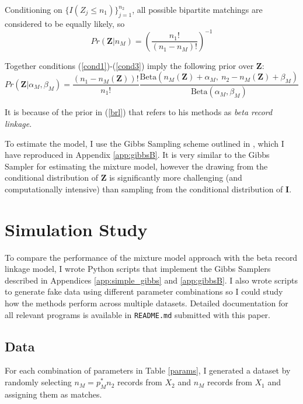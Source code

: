 \documentclass[11pt,reqno]{amsart}
\begin{document}
Conditioning on $\{I(Z_j \leq n_1)\}_{j=1}^{n_2}$, all possible bipartite matchings are considered to be equally likely, so \begin{equation} Pr\left(\mathbf{Z} | n_{M}\right) = \left(\frac{n_1!}{(n_1-n_{M})!}\right)^{-1} \label{cond3} \end{equation}

Together conditions (\ref{cond1})-(\ref{cond3}) imply the following prior over $\mathbf{Z}$:
\begin{equation}Pr(\mathbf{Z} | \alpha_M, \beta_M) = \frac{(n_1-n_{M}(\mathbf{Z}))!}{n_1!}\frac{\text{Beta}(n_{M}(\mathbf{Z}) + \alpha_M,\ n_2-n_{M}(\mathbf{Z}) + \beta_M)}{\text{Beta}(\alpha_M, \beta_M)} \label{brl} \end{equation}

It is because of the prior in (\ref{brl}) that \cite{sadinle_2017} refers to his methods as \textit{beta record linkage}. 

To estimate the model, I use the Gibbs Sampling scheme outlined in \cite{larsen_2005}, which I have reproduced in Appendix \ref{app:gibbsB}.  It is very similar to the Gibbs Sampler for estimating the mixture model, however the drawing  from the conditional distribution of $\mathbf{Z}$ is significantly more challenging (and computationally intensive) than sampling from the conditional distribution of $\mathbf{I}$.  

\section{Simulation Study}

To compare the performance of the mixture model approach with the beta record linkage model, I wrote Python scripts that implement the Gibbs Samplers described in Appendices \ref{app:simple_gibbs} and \ref{app:gibbsB}.  I also wrote scripts to generate fake data using different parameter combinations so I could study how the methods perform across multiple datasets.   Detailed documentation for all relevant programs is available in \texttt{README.md} submitted with this paper. 

\subsection{Data}

For each combination of parameters in Table \ref{params}, I generated a dataset by randomly selecting $n_M = p_M^* n_2$ records from $X_2$ and $n_M$ records from $X_1$ and assigning them as matches.  
\end{document}
